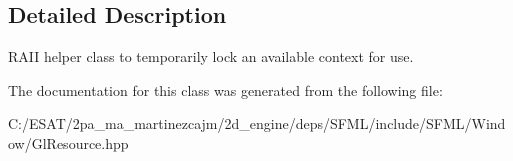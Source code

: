 \subsection{Detailed Description}
R\+A\+II helper class to temporarily lock an available context for use. 

The documentation for this class was generated from the following file\+:\begin{DoxyCompactItemize}
\item 
C\+:/\+E\+S\+A\+T/2pa\+\_\+ma\+\_\+martinezcajm/2d\+\_\+engine/deps/\+S\+F\+M\+L/include/\+S\+F\+M\+L/\+Window/Gl\+Resource.\+hpp\end{DoxyCompactItemize}
